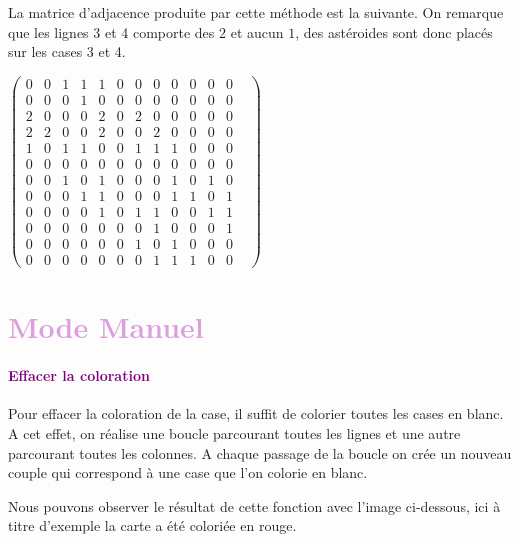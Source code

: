 \documentclass{report}
\begin{document}
			La matrice d'adjacence produite par cette méthode est la suivante. On remarque que les lignes 3 et 4 comporte des $2$ et aucun $1$, des astéroides sont donc placés sur les cases 3 et 4.
			\setcounter{MaxMatrixCols}{13}
			\\
			\begin{center}
			$\begin{pmatrix}
			0&0&1&1&1&0&0&0&0&0&0&0&\\
			0&0&0&1&0&0&0&0&0&0&0&0&\\
			2&0&0&0&2&0&2&0&0&0&0&0&\\
			2&2&0&0&2&0&0&2&0&0&0&0&\\
			1&0&1&1&0&0&1&1&1&0&0&0&\\
			0&0&0&0&0&0&0&0&0&0&0&0&\\
			0&0&1&0&1&0&0&0&1&0&1&0&\\
			0&0&0&1&1&0&0&0&1&1&0&1&\\
			0&0&0&0&1&0&1&1&0&0&1&1&\\
			0&0&0&0&0&0&0&1&0&0&0&1&\\
			0&0&0&0&0&0&1&0&1&0&0&0&\\
			0&0&0&0&0&0&0&1&1&1&0&0&
			\end{pmatrix}$	
			\end{center}
			
		\section*{\textcolor{Plum}{Mode Manuel}}
			      \paragraph{\textcolor{purple}{Effacer la coloration}} 
    Pour effacer la coloration de la case, il suffit de colorier toutes les cases en blanc. 
    A cet effet, on réalise une boucle parcourant toutes les lignes  et une autre parcourant toutes les colonnes. A chaque passage de la boucle on crée un nouveau couple qui correspond à une case que l'on colorie en blanc. %
       
      Nous pouvons observer le résultat de cette fonction avec l'image ci-dessous, ici à titre d'exemple la carte a été coloriée en rouge.
       
\end{document}
